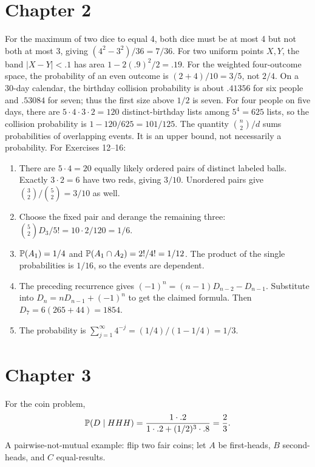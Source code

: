 \section*{Chapter 2}
For the maximum of two dice to equal 4, both dice must be at most 4 but not both at most 3, giving $(4^2-3^2)/36=7/36$. For two uniform points $X,Y$, the band $|X-Y|<.1$ has area $1-2(.9)^2/2=.19$.
For the weighted four-outcome space, the probability of an even outcome
is $(2+4)/10=3/5$, not $2/4$.
On a 30-day calendar, the birthday collision probability is about
$.41356$ for six people and $.53084$ for seven; thus the first size above
$1/2$ is seven. For four people on five days, there are
$5\cdot4\cdot3\cdot2=120$ distinct-birthday lists among $5^4=625$ lists,
so the collision probability is $1-120/625=101/125$.
The quantity $\binom n2/d$ sums probabilities of overlapping events.
It is an upper bound, not necessarily a probability.
For Exercises 12--16:
\begin{enumerate}[start=12]
 \item There are $5\cdot4=20$ equally likely ordered pairs of distinct
 labeled balls. Exactly $3\cdot2=6$ have two reds, giving $3/10$.
 Unordered pairs give $\binom32/\binom52=3/10$ as well.
 \item Choose the fixed pair and derange the remaining three:
 $\binom52D_3/5!=10\cdot2/120=1/6$.
 \item $\P(A_1)=1/4$ and $\P(A_1\cap A_2)=2!/4!=1/12$.
 The product of the single probabilities is $1/16$, so the events
 are dependent.
 \item The preceding recurrence gives
 $(-1)^n=(n-1)D_{n-2}-D_{n-1}$.
 Substitute into $D_n=nD_{n-1}+(-1)^n$ to get the claimed formula.
 Then $D_7=6(265+44)=1854$.
 \item The probability is $\sum_{j=1}^{\infty}4^{-j}
 =(1/4)/(1-1/4)=1/3$.
\end{enumerate}

\section*{Chapter 3}
For the coin problem,
\[
\P(D\mid HHH)=\frac{1\cdot .2}{1\cdot .2+(1/2)^3\cdot .8}=\frac23.
\]
A pairwise-not-mutual example: flip two fair coins; let $A$ be first-heads, $B$ second-heads, and $C$ equal-results.

